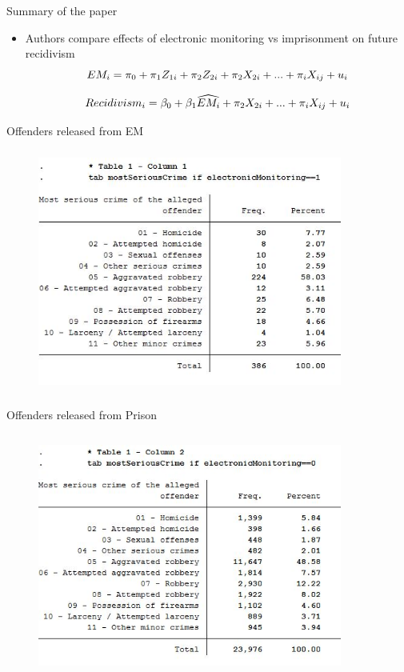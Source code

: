 \documentclass{beamer}
\begin{document}
\begin{frame}{Summary of the paper}
\begin{itemize}
        \item Authors compare effects of electronic monitoring vs imprisonment on future recidivism
         \begin{equation}
    \centering
    EM_i = \pi_0 + \pi_1Z_{1i} + \pi_2Z_{2i} + \pi_2X_{2i} + ... + \pi_iX_{ij} + u_i  
    \end{equation}
    
        
         \begin{equation}
    \centering
    Recidivism_i = \beta_0 + \beta_1\widehat{EM_i} + \pi_2X_{2i} + ... + \pi_iX_{ij} + u_i  
\end{equation}


    \end{itemize}
\end{frame}
\begin{frame}{Offenders released from EM}
      \begin{figure}        
\centering
\includegraphics[width=10cm, height = 8cm]{Table1.JPG}
\end{figure}
\end{frame}
\begin{frame}{Offenders released from Prison}
      \begin{figure}        
\centering
\includegraphics[width=10cm, height = 8cm]{Table11.JPG}
\end{figure}
\end{frame}
\end{document}
